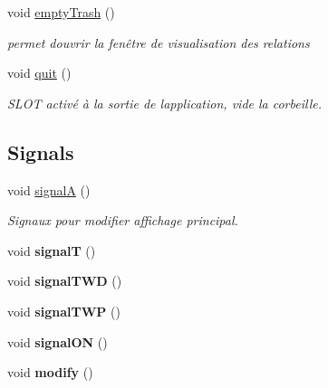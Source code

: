 \begin{DoxyCompactItemize}
\mbox{\label{classMainWindow_a5de69af7ba114e000c0ee400eeca4d8a}} 
void \hyperlink{classMainWindow_a5de69af7ba114e000c0ee400eeca4d8a}{empty\+Trash} ()
\begin{DoxyCompactList}\small\item\em permet d\textquotesingle{}ouvrir la fenêtre de visualisation des relations \end{DoxyCompactList}\item 
\mbox{\label{classMainWindow_a542a7527ced73b2c9bc14f8dc9661a66}} 
void \hyperlink{classMainWindow_a542a7527ced73b2c9bc14f8dc9661a66}{quit} ()
\begin{DoxyCompactList}\small\item\em S\+L\+OT activé à la sortie de l\textquotesingle{}application, vide la corbeille. \end{DoxyCompactList}\end{DoxyCompactItemize}
\subsection*{Signals}
\begin{DoxyCompactItemize}
\item 
\mbox{\label{classMainWindow_ada963514542ea406cb4bbda85f136b4d}} 
void \hyperlink{classMainWindow_ada963514542ea406cb4bbda85f136b4d}{signalA} ()
\begin{DoxyCompactList}\small\item\em Signaux pour modifier affichage principal. \end{DoxyCompactList}\item 
\mbox{\label{classMainWindow_a062ade3e6f2faa57029c665c60da6e72}} 
void {\bfseries signalT} ()
\item 
\mbox{\label{classMainWindow_a60d52b271cbb216a643818269d66c967}} 
void {\bfseries signal\+T\+WD} ()
\item 
\mbox{\label{classMainWindow_aa0bf148da373a83bd8a7c7719d408d22}} 
void {\bfseries signal\+T\+WP} ()
\item 
\mbox{\label{classMainWindow_af7b7ddd9fe3cabf40dd87dd41b71fdad}} 
void {\bfseries signal\+ON} ()
\item 
\mbox{\label{classMainWindow_ac91b2f01c4c6abe81ac7c495112b1576}} 
void {\bfseries modify} ()
\end{DoxyCompactItemize}

